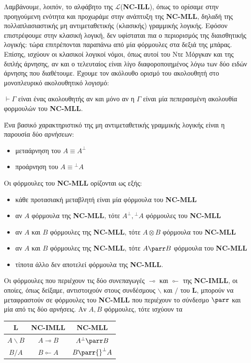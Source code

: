 \documentclass [a4paper,11pt] {book}
\theoremstyle{definition}
\theoremstyle{definition}
\begin{document}
Λαμβάνουμε, λοιπόν, το αλφάβητο της $\mathcal{L}$(\textbf{NC-ILL}), όπως το ορίσαμε στην προηγούμενη ενότητα και προχωράμε στην ανάπτυξη της \textbf{NC-MLL}, δηλαδή της πολλαπλασιαστικής μη αντιμεταθετικής (κλασικής) γραμμικής λογικής. Εφόσον επιστρέφουμε στην κλασική λογική, δεν υφίσταται πια ο περιορισμός της διαισθητικής λογικής: τώρα επιτρέπονται παραπάνω από μία φόρμουλες στα δεξιά της μπάρας. Επίσης, ισχύουν οι κλασικοί λογικοί νόμοι, όπως αυτοί του Ντε Μόργκαν και της διπλής άρνησης, αν και ο τελευταίος είναι λίγο διαφοροποιημένος λόγω των δύο ειδών άρνησης που διαθέτουμε. Έχουμε τον ακόλουθο ορισμό του ακολουθητή στο μονοπλευρικό ακολουθητικό λογισμό:
\begin{center}
$\vdash \Gamma$ είναι ένας ακολουθητής αν και μόνο αν η $\Gamma$ είναι μία πεπερασμένη ακολουθία φορμουλών του \textbf{NC-MLL}.
\end{center}
Ένα βασικό χαρακτηριστικό της μη αντιμεταθετικής γραμμικής λογικής είναι η παρουσία δύο αρνήσεων:
\begin{itemize}
\item μεταάρνηση του $A\equiv A^{\bot}$
\item προάρνηση του $A\equiv {}^{\bot}A $
\end{itemize}
Οι φόρμουλες του \textbf{NC-MLL} ορίζονται ως εξής:
\begin{itemize}
\item κάθε προτασιακή μεταβλητή είναι μία φόρμουλα του \textbf{NC-MLL}
\item αν $A$ φόρμουλα της \textbf{NC-MLL}, τότε $A^{\bot}, {}^{\bot}A$ φόρμουλες του \textbf{NC-MLL}
\item αν $A$ και $B$ φόρμουλες της \textbf{NC-MLL}, τότε $A\otimes B$ φόρμουλα του \textbf{NC-MLL}
\item αν $A$ και $B$ φόρμουλες της \textbf{NC-MLL}, τότε $A\parr B$ φόρμουλα του \textbf{NC-MLL}
\item τίποτα άλλο δεν αποτελεί φόρμουλα της \textbf{NC-MLL}.
\end{itemize}
Οι φόρμουλες που περιέχουν τις δύο συνεπαγωγές $\multimap$ και $\multimapinv$ της \textbf{NC-IMLL}, οι οποίες, όπως δείξαμε, αντιστοιχούν στους συνδέσμους $\backslash$ και $/$ του \textbf{L}, μπορούν να μεταφραστούν σε φόρμουλες του \textbf{NC-MLL} που περιέχουν το σύνδεσμο $\parr$ και μία από τις δύο αρνήσεις. Αν $A,B$ φόρμουλες, τότε ισχύουν τα
\begin{center}
{\setlength{\extrarowheight}{5pt}
\begin{tabular}{ccc}
\textbf{L} & \textbf{NC-IMLL} & \textbf{NC-MLL}  \\ \hline
$A\backslash B$ & $A\multimap B$ & $A^{\bot}\parr B$ \\
$B/A$ & $B \multimapinv A$ & $B\parr {}^{\bot}A$
\end{tabular}}
\end{center}
\end{document}
